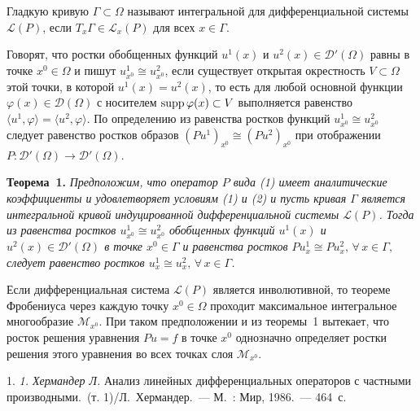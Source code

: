 Гладкую кривую $\Gamma\subset\Omega$ называют интегральной для дифференциальной системы ${\mathcal L}(P)$, если
$T_x\Gamma\in{\mathcal L}_{x}(P)$
для всех $x\in\Gamma$.

Говорят, что ростки обобщенных  функций $u^1(x)$ и $u^2(x)\in {\mathcal D}'(\Omega)$ равны в точке $x^0\in \Omega$ и пишут  $u_{x^0}^1\cong u_{x^0}^2$, если существует открытая окрестность $V\subset \Omega$ этой точки, в которой $u^1(x)=u^2(x)$, то есть для любой основной функции $\varphi(x)\in {\mathcal D}(\Omega)$ с носителем ${\rm supp}\,\varphi(x)\subset V$ выполняется равенство
$\langle u^1,\varphi  \rangle= \langle u^2,\varphi  \rangle.$
По определению из равенства ростков функций $u_{x^0}^1\cong u_{x^0}^2$ следует равенство ростков образов $(Pu^1)_{x^0}\cong (Pu^2)_{x^0}$ при отображении  $P: {\mathcal D}'(\Omega) \to {\mathcal D}'(\Omega)$.



\textbf{Теорема~1.} {\it Предположим, что оператор $P$ вида {\rm (1)} имеет аналитические коэффициенты и удовлетворяет условиям {\rm (1)} и {\rm (2)} и
пусть кривая $\Gamma$ является интегральной кривой индуцированной дифференциальной системы ${\mathcal L}(P)$.
Тогда из равенства ростков
$u_{x^0}^1\cong u_{x^0}^2$  обобщенных функций
$u^1(x)$ и $u^2(x)\in {\mathcal D}'(\Omega)$
 в  точке $x^0\in \Gamma$ и равенства ростков
$Pu^1_x\cong Pu^2_x,\,\forall\,x\in \Gamma,$ следует равенство ростков  $u^1_x\cong u^2_x,\,\forall\,x\in \Gamma$.
}

Если дифференциальная система ${\mathcal L}(P)$ является инволютивной, то теореме Фробениуса через каждую точку $x^0\in \Omega$ проходит максимальное интегральное многообразие ${\mathcal M}_{x^0}$. При таком предположении и из теоремы~1 вытекает, что росток решения уравнения $Pu=f$ в точке $x^0$ однозначно определяет ростки решения этого уравнения во всех точках слоя ${\mathcal M}_{x^0}$.


\litlist

1. {\it 1. Хермандер Л.} Анализ линейных дифференциальных операторов с частными производными.~(т. 1)/Л.~Хермандер.~--- М.~: Мир, 1986.~--- 464~с.

